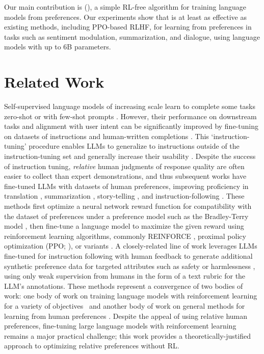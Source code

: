 \documentclass{article}
\begin{document}
Our main contribution is {\methodfull} (\methodac), a simple RL-free algorithm for training language models from preferences. Our experiments show that {\methodac} is at least as effective as existing methods, including PPO-based RLHF, for learning from preferences in tasks such as sentiment modulation, summarization, and dialogue, using language models with up to 6B parameters.

\section{Related Work}







Self-supervised language models of increasing scale learn to complete some tasks zero-shot \citep{radford2019language} or with few-shot prompts \citep{gpt3,megatron,chowdhery2022palm}. However, their performance on downstream tasks and alignment with user intent can be significantly improved by fine-tuning on datasets of instructions and human-written completions \citep{mishra-etal-2022-cross,sanh2022multitask,chung2022scaling,thoppilan2022lamda}. This `instruction-tuning' procedure
enables LLMs to generalize to instructions outside of the instruction-tuning set and generally increase their usability \citep{chung2022scaling}. Despite the success of instruction tuning, \textit{relative} human judgments of response quality are often easier to collect than expert demonstrations, and thus subsequent works have fine-tuned LLMs with datasets of human preferences, improving proficiency in translation \citep{kreutzer-etal-2018-reliability}, summarization \citep{stiennon2022learning,ziegler2020finetuning}, story-telling \citep{ziegler2020finetuning}, and instruction-following \citep{ouyang2022training,ramamurthy2023is}. These methods first optimize a neural network reward function for compatibility with the dataset of preferences under a preference model such as the Bradley-Terry model \citep{bradley1952rankanalysis}, then fine-tune a language model to maximize the given reward using reinforcement learning algorithms, commonly REINFORCE \citep{williams1992reinforce}, proximal policy optimization (PPO; \cite{schulman2017proximal}), or variants \citep{ramamurthy2023is}. A closely-related line of work leverages LLMs fine-tuned for instruction following with human feedback to generate additional synthetic preference data for targeted attributes such as safety or harmlessness \citep{bai2022constitutional}, using only weak supervision from humans in the form of a text rubric for the LLM's annotations. These methods represent a convergence of two bodies of work: one body of work on training language models with reinforcement learning for a variety of objectives~\citep{Ranzato2015SequenceLT,paulus2018a,wu2018learning} and another body of work on general methods for learning from human preferences \citep{christiano2017deep,kupcsik2018learning}. 
Despite the appeal of using relative human preferences, fine-tuning large language models with reinforcement learning remains a major practical challenge; this work provides a theoretically-justified approach to optimizing relative preferences without RL.
\end{document}
